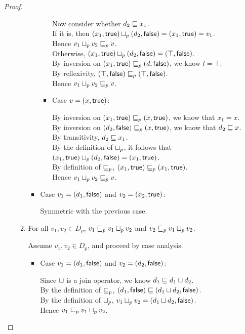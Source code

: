 \begin{proof}
\begin{enumerate}
\begin{enumerate}
\begin{itemize}
\begin{itemize}
       Now consider whether $d_2 \sqsubseteq x_1$. \\
       If it is, then $(x_1, \textsf{true})  \sqcup_p  (d_2, \textsf{false}) = (x_1, \textsf{true}) = v_1$. \\ 
       Hence $v_1 \sqcup_p v_2 \sqsubseteq_p v$. \\ 
       Otherwise, $(x_1, \textsf{true})  \sqcup_p  (d_2, \textsf{false}) = (\top, \textsf{false})$. \\ 
       By inversion on $(x_1, \textsf{true}) \sqsubseteq_p (d, \textsf{false})$, we know $l = \top$. \\
       By reflexivity, $(\top, \textsf{false}) \sqsubseteq_p (\top, \textsf{false})$. \\ 
       Hence $v_1 \sqcup_p v_2 \sqsubseteq_p v$. 
       
     \item Case $v = (x, \textsf{true})$:  
  
       By inversion on $(x_1, \textsf{true}) \sqsubseteq_p (x, \textsf{true})$, we know that $x_1 = x$. \\ 
       By inversion on $(d_2, \textsf{false}) \sqsubseteq_p (x, \textsf{true})$, we know that $d_2 \sqsubseteq x$. \\ 
       By transitivity, $d_2 \sqsubseteq x_1$. \\ 
       By the definition of $ \sqcup_p $, it follows that $(x_1, \textsf{true})  \sqcup_p  (d_2, \textsf{false}) = (x_1, \textsf{true})$. \\ 
       By definition of $\sqsubseteq_p$, $(x_1, \textsf{true}) \sqsubseteq_p (x_1, \textsf{true})$. \\ 
       Hence $v_1 \sqcup_p v_2 \sqsubseteq_p v$. 
     \end{itemize}
  
   \item Case $v_1 = (d_1, \textsf{false})$ and $v_2 = (x_2, \textsf{true})$: 
  
     Symmetric with the previous case. 
   \end{itemize}
 \item For all $v_1, v_2 \in D_p$, $v_1 \sqsubseteq_p v_1 \sqcup_p v_2$ and $v_2 \sqsubseteq_p v_1 \sqcup_p v_2$.
    
    Assume $v_1, v_2 \in D_p$, and proceed by case analysis. 
    \begin{itemize}
      \item Case $v_1 = (d_1, \textsf{false})$ and $v_2 = (d_2, \textsf{false})$:

        Since $ \sqcup $ is a join operator, we know $d_1 \sqsubseteq d_1 \sqcup d_2$.\\
        By the definition of $\sqsubseteq_p$, $(d_1, \textsf{false}) \sqsubseteq (d_1 \sqcup d_2, \textsf{false})$.\\
        By the definition of $ \sqcup_p $, $v_1 \sqcup_p v_2 = (d_1 \sqcup d_2, \textsf{false})$.\\
        Hence $v_1 \sqsubseteq_p v_1 \sqcup_p v_2$.  \\


\end{itemize}
\end{enumerate}
\end{enumerate}
\end{proof}
